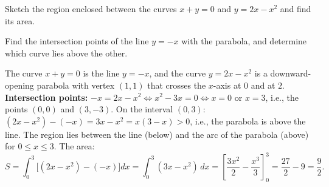 
\begin{question}
Sketch the region enclosed between the curves $x+y=0$ and $y=2x-x^2$ and find its area.
\end{question}

\begin{hint}
Find the intersection points of the line $y=-x$ with the parabola, and determine which curve lies above the other.
\end{hint}

\begin{solution}
The curve $x+y=0$ is the line $y=-x$, and the curve $y=2x-x^2$ is a downward-opening parabola with vertex $(1,1)$ that crosses the $x$-axis at $0$ and at $2$.
\textbf{Intersection points:} $-x=2x-x^2\iff x^2-3x=0\iff x=0$ or $x=3$, i.e., the points $(0,0)$ and $(3,-3)$.
On the interval $(0,3)$: $(2x-x^2)-(-x)=3x-x^2=x(3-x)>0$, i.e., the parabola is above the line. The region lies between the line (below) and the arc of the parabola (above) for $0\le x\le3$. The area:
\[ S=\int_0^3\big[(2x-x^2)-(-x)\big]dx=\int_0^3(3x-x^2)\,dx=\left[\frac{3x^2}{2}-\frac{x^3}{3}\right]_0^3=\frac{27}{2}-9=\boxed{\frac92}. \]
\end{solution}
